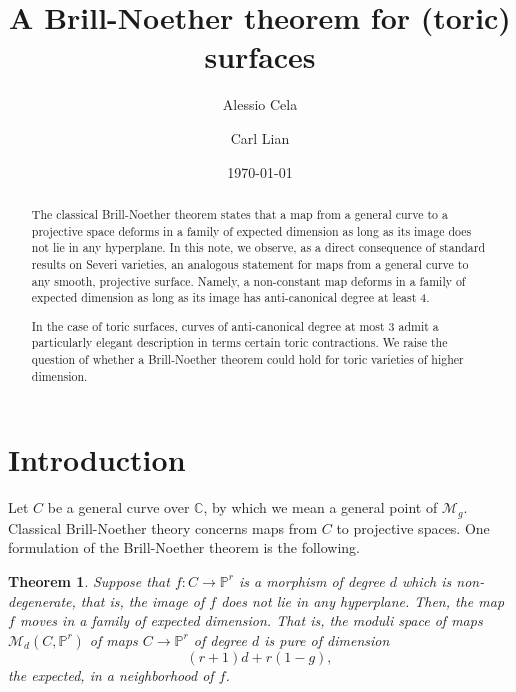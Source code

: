 \documentclass[12pt]{amsart}
\title{A Brill-Noether theorem for (toric) surfaces}
\author{Alessio Cela}
\author{Carl Lian}
\date{\today}
\def\cM{{\mathcal{M}}}
\def\P{\mathbb{P}}
\newtheorem{theorem}[definition]{Theorem}
\newcommand{\Ale}[1]{{\color{red}A: #1}}
\begin{document}
\maketitle

\begin{abstract}
The classical Brill-Noether theorem states that a map from a general curve to a projective space deforms in a family of expected dimension as long as its image does not lie in any hyperplane. In this note, we observe, as a direct consequence of standard results on Severi varieties, an analogous statement for maps from a general curve to any smooth, projective surface. Namely, a non-constant map deforms in a family of expected dimension as long as its image has anti-canonical degree at least 4. 

In the case of toric surfaces, curves of anti-canonical degree at most 3 admit a particularly elegant description in terms certain toric contractions. We raise the question of whether a Brill-Noether theorem could hold for toric varieties of higher dimension.
\end{abstract}


\section{Introduction}

Let $C$ be a general curve over $\mathbb{C}$, by which we mean a general point of $\cM_g$. Classical Brill-Noether theory concerns maps from $C$ to projective spaces. One formulation of the Brill-Noether theorem is the following.

\begin{theorem}\label{thm:BN_classical}
    Suppose that $f:C\to\P^r$ is a morphism of degree $d$ which is \emph{non-degenerate}, that is, the image of $f$ does not lie in any hyperplane. Then, the map $f$ moves in a family of expected dimension. That is, the moduli space of maps $\cM_d(C,\P^r)$ of maps $C \to \P^r$ of degree $d$ is pure of dimension
    \begin{equation*}
        (r+1)d+r(1-g),
    \end{equation*}
    the expected, in a neighborhood of $f$.
\end{theorem}
\end{document}

